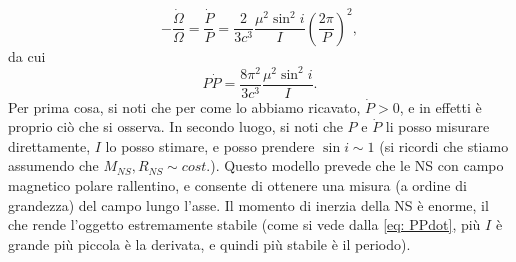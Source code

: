 \begin{equation}
   - \frac{\dot{\Omega}}{\Omega}=\frac{\dot{P}}{P}=\frac{2}{3c^3}\frac{\mu^2\sin^2{i}}{I}\left(\frac{2\pi}{P}\right)^2,
\end{equation}
da cui
\begin{equation}
    P\dot{P}=\frac{8\pi^2}{3c^3}\frac{\mu^2\sin^2{i}}{I}.
    \label{eq: PPdot}
\end{equation}
Per prima cosa, si noti che per come lo abbiamo ricavato, $\dot{P}>0$, e in effetti è proprio ciò che si osserva.
In secondo luogo, si noti che $P$ e $\dot{P}$ li posso misurare direttamente, $I$ lo posso stimare, e posso prendere $\sin{i}\sim1$ (si ricordi che stiamo assumendo che $M_{NS}, R_{NS}\sim cost. $).
Questo modello prevede che le NS con campo magnetico polare rallentino, e consente di ottenere una misura (a ordine di grandezza) del campo lungo l'asse.
Il momento di inerzia della NS è enorme, il che rende l'oggetto estremamente stabile (come si vede dalla \eqref{eq: PPdot}, più $I$ è grande più piccola è la derivata, e quindi più stabile è il periodo).

